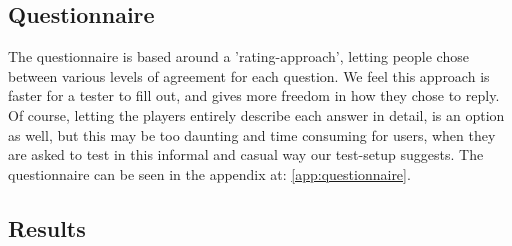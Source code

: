 \subsection{Questionnaire}

The questionnaire is based around a 'rating-approach', letting people chose between various levels of agreement for each question. We feel this approach is faster for a tester to fill out, and gives more freedom in how they chose to reply. Of course, letting the players entirely describe each answer in detail, is an option as well, but this may be too daunting and time consuming for users, when they are asked to test in this informal and casual way our test-setup suggests. The questionnaire can be seen in the appendix at: \ref{app:questionnaire}.




\subsection{Results}